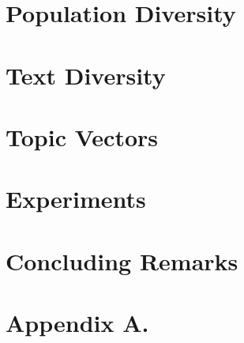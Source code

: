 \documentclass{article} %
\begin{document}
\section{Population Diversity}
\label{sec:popular-diversity}



\section{Text Diversity}
\label{sec:text-diversity}



\section{Topic Vectors}
\label{sec:topic-vectors}


\section{Experiments}
\label{sec:experiments}




\section{Concluding Remarks}
\label{sec:conclusions}




\newpage

\appendix
\section*{Appendix A.}




\end{document}
